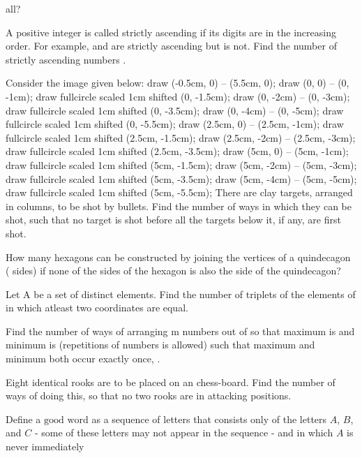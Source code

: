   all?
\item A positive integer  is called strictly ascending if its digits are in the increasing order. For
  example,  and  are strictly ascending but  is not. Find the number of strictly
  ascending numbers .
\item Consider the image given below:
  \startplacefigure
    \startMPcode
      draw (-0.5cm, 0) -- (5.5cm, 0);
      draw (0, 0) -- (0, -1cm);
      draw fullcircle scaled 1cm shifted (0, -1.5cm);
      draw (0, -2cm) -- (0, -3cm);
      draw fullcircle scaled 1cm shifted (0, -3.5cm);
      draw (0, -4cm) -- (0, -5cm);
      draw fullcircle scaled 1cm shifted (0, -5.5cm);
      draw (2.5cm, 0) -- (2.5cm, -1cm);
      draw fullcircle scaled 1cm shifted (2.5cm, -1.5cm);
      draw (2.5cm, -2cm) -- (2.5cm, -3cm);
      draw fullcircle scaled 1cm shifted (2.5cm, -3.5cm);
      draw (5cm, 0) -- (5cm, -1cm);
      draw fullcircle scaled 1cm shifted (5cm, -1.5cm);
      draw (5cm, -2cm) -- (5cm, -3cm);
      draw fullcircle scaled 1cm shifted (5cm, -3.5cm);
      draw (5cm, -4cm) -- (5cm, -5cm);
      draw fullcircle scaled 1cm shifted (5cm, -5.5cm);
    \stopMPcode
  \stopplacefigure
  There are  clay targets, arranged in  columns, to be shot by  bullets. Find the number of
  ways in which they can be shot, such that no target is shot before all the targets below it, if any, are
  first shot.
\item How many hexagons can be constructed by joining the vertices of a quindecagon ( sides) if none
  of the sides of the hexagon is also the side of the quindecagon?
\item Let A be a set of  distinct elements. Find the number of triplets  of the
  elements of  in which atleast two coordinates are equal.
\item Find the number of ways of arranging m numbers out of  so that maximum is  and minimum is  (repetitions of numbers is allowed) such that maximum and minimum both occur
  exactly once, .
\item Eight identical rooks are to be placed on an  chess-board. Find the number of ways of
  doing this, so that no two rooks are in attacking positions.
\item Define a $\text{good~word}$ as a sequence of letters that consists only of the letters $A$, $B$, and
  $C$ - some of these letters may not appear in the sequence - and in which $A$ is never immediately
